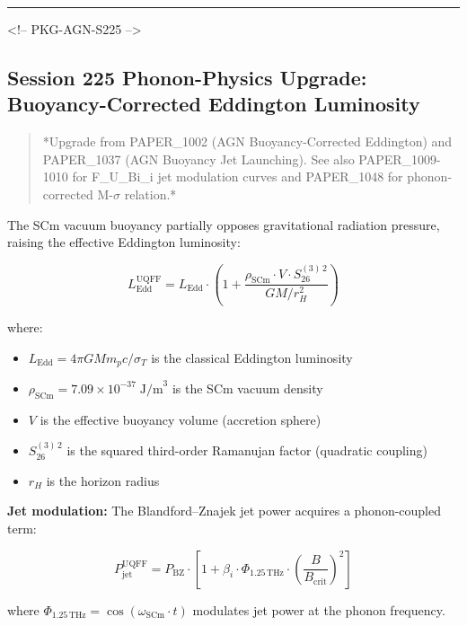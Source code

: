 \documentclass[12pt,a4paper]{article}
\begin{document}
\medskip\hrule\medskip

<!-- PKG-AGN-S225 -->

\subsection{Session 225 Phonon-Physics Upgrade: Buoyancy-Corrected Eddington Luminosity}

\begin{quote}
*Upgrade from PAPER\_1002 (AGN Buoyancy-Corrected Eddington) and PAPER\_1037
(AGN Buoyancy Jet Launching).  See also PAPER\_1009-1010 for F\_{U\_Bi\_i} jet
modulation curves and PAPER\_1048 for phonon-corrected M-$\sigma$ relation.*
\end{quote}

The SCm vacuum buoyancy partially opposes gravitational radiation pressure, raising the effective Eddington luminosity:

\begin{equation}
L_{\text{Edd}}^{\text{UQFF}} = L_{\text{Edd}} \cdot \left(1 + \frac{\rho_{\text{SCm}} \cdot V \cdot S_{26}^{(3)\,2}}{G M / r_H^2}\right)
\end{equation}

where:

\begin{itemize}
  \item $L_{\text{Edd}} = 4\pi G M m_p c / \sigma_T$ is the classical Eddington luminosity
  \item $\rho_{\text{SCm}} = 7.09 \times 10^{-37}\;\text{J/m}^3$ is the SCm vacuum density
  \item $V$ is the effective buoyancy volume (accretion sphere)
  \item $S_{26}^{(3)\,2}$ is the squared third-order Ramanujan factor (quadratic coupling)
  \item $r_H$ is the horizon radius
\end{itemize}

\textbf{Jet modulation:} The Blandford--Znajek jet power acquires a phonon-coupled term:

\begin{equation}
P_{\text{jet}}^{\text{UQFF}} = P_{\text{BZ}} \cdot \left[1 + \beta_i \cdot \Phi_{1.25\,\text{THz}} \cdot \left(\frac{B}{B_{\text{crit}}}\right)^2\right]
\end{equation}

where $\Phi_{1.25\,\text{THz}} = \cos(\omega_{\text{SCm}} \cdot t)$ modulates jet power at the phonon frequency.
\end{document}
